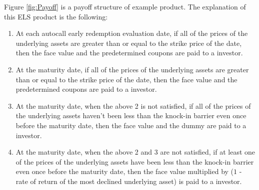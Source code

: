 \documentclass[11pt,reqno]{article}
\numberwithin{equation}{section}
\begin{document}
{Figure \ref{fig:Payoff} is a payoff structure of example product.
 The explanation of this ELS product is the following:
\begin{enumerate}
    \item At each autocall early redemption evaluation date, if all of the prices of the underlying assets are greater than or equal to the strike price of the date, then the face value and the predetermined coupons are paid to a investor.
    \item At the maturity date, if all of the prices of the underlying assets are greater than or equal to the strike price of the date, then the face value and the predetermined coupons are paid to a investor.
    \item At the maturity date, when the above 2 is not satisfied, if all of the prices of the underlying assets haven't been less than the knock-in barrier even once before the maturity date, then the face value and the dummy are paid to a investor.
    \item At the maturity date, when the above 2 and 3 are not satisfied, if at least one of the prices of the underlying assets have been less than the knock-in barrier even once before the maturity date, then the face value multiplied by ($1$ - rate of return of the most declined underlying asset) is paid to a investor.
\end{enumerate}

}
\end{document}
